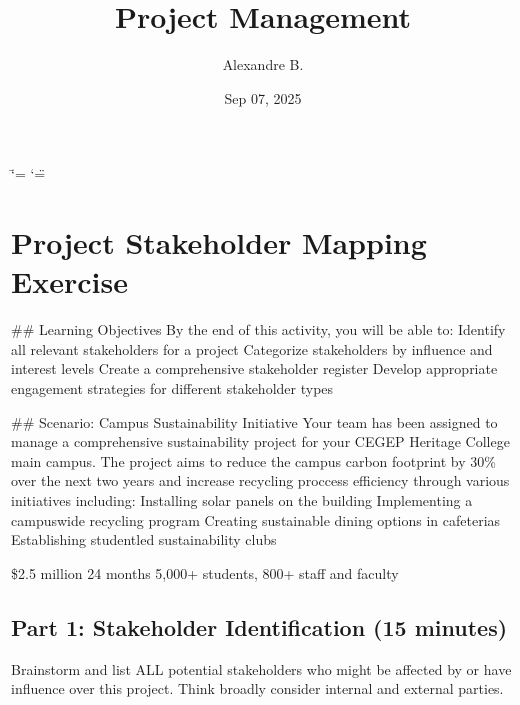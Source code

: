 \documentclass[letterpaper,10pt,english]{sphinxmanual}
\title{Project Management}
\date{Sep 07, 2025}
\author{Alexandre B.\@{}}
\begin{document}
\ifdefined\shorthandoff
  \ifnum\catcode`\=\string=\active\shorthandoff{=}\fi
  \ifnum\catcode`\"=\active{}\fi
\fi

\pagestyle{empty}
\sphinxmaketitle
\pagestyle{plain}
\sphinxtableofcontents
\pagestyle{normal}
\label{\detokenize{index::doc}}


\sphinxstepscope


\chapter{Project Stakeholder Mapping Exercise}
\label{\detokenize{mapping_stakeholder:project-stakeholder-mapping-exercise}}\label{\detokenize{mapping_stakeholder::doc}}
\sphinxAtStartPar
\#\# Learning Objectives
By the end of this activity, you will be able to:
\sphinxhyphen{} Identify all relevant stakeholders for a project
\sphinxhyphen{} Categorize stakeholders by influence and interest levels
\sphinxhyphen{} Create a comprehensive stakeholder register
\sphinxhyphen{} Develop appropriate engagement strategies for different stakeholder types

\sphinxAtStartPar
\#\# Scenario: Campus Sustainability Initiative
Your team has been assigned to manage a comprehensive sustainability project for your CEGEP Heritage College main campus. The project aims to reduce the campus carbon footprint by 30\% over the next two years and increase recycling proccess efficiency through various initiatives including:
\sphinxhyphen{} Installing solar panels on the building
\sphinxhyphen{} Implementing a campus\sphinxhyphen{}wide recycling program
\sphinxhyphen{} Creating sustainable dining options in cafeterias
\sphinxhyphen{} Establishing student\sphinxhyphen{}led sustainability clubs

\sphinxAtStartPar
{} \$2.5 million
 24 months
 5,000+ students, 800+ staff and faculty


\section{Part 1: Stakeholder Identification (15 minutes)}
\label{\detokenize{mapping_stakeholder:part-1-stakeholder-identification-15-minutes}}
\sphinxAtStartPar
{} Brainstorm and list ALL potential stakeholders who might be affected by or have influence over this project. Think broadly \sphinxhyphen{} consider internal and external parties.
\end{document}
